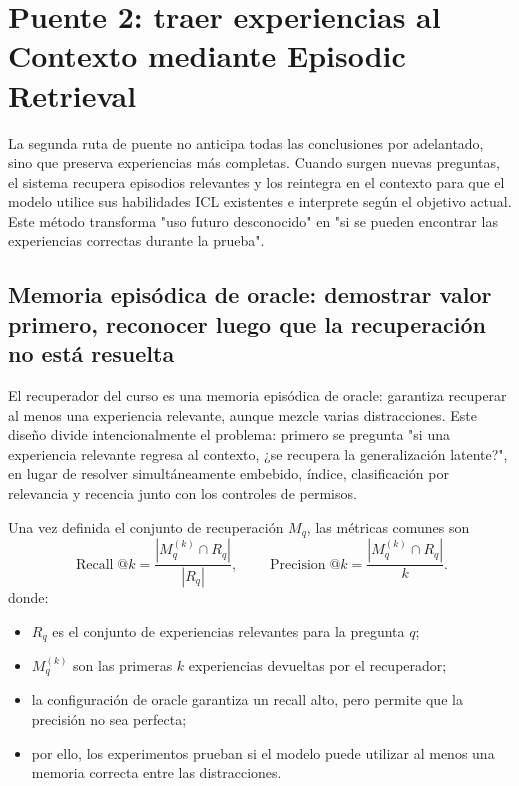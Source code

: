 \section{Puente 2: traer experiencias al Contexto mediante Episodic Retrieval}

La segunda ruta de puente no anticipa todas las conclusiones por adelantado, sino que preserva experiencias más completas. Cuando surgen nuevas preguntas, el sistema recupera episodios relevantes y los reintegra en el contexto para que el modelo utilice sus habilidades ICL existentes e interprete según el objetivo actual. Este método transforma "uso futuro desconocido" en "si se pueden encontrar las experiencias correctas durante la prueba".

\subsection{Memoria episódica de oracle: demostrar valor primero, reconocer luego que la recuperación no está resuelta}

El recuperador del curso es una memoria episódica de oracle: garantiza recuperar al menos una experiencia relevante, aunque mezcle varias distracciones. Este diseño divide intencionalmente el problema: primero se pregunta "si una experiencia relevante regresa al contexto, ¿se recupera la generalización latente?", en lugar de resolver simultáneamente embebido, índice, clasificación por relevancia y recencia junto con los controles de permisos.


Una vez definida el conjunto de recuperación $M_q$, las métricas comunes son
$$
\operatorname{Recall}@k=\frac{|M_q^{(k)}\cap R_q|}{|R_q|},
\qquad
\operatorname{Precision}@k=\frac{|M_q^{(k)}\cap R_q|}{k}.
$$
donde:
\begin{itemize}
  \item $R_q$ es el conjunto de experiencias relevantes para la pregunta $q$;
  \item $M_q^{(k)}$ son las primeras $k$ experiencias devueltas por el recuperador;
  \item la configuración de oracle garantiza un recall alto, pero permite que la precisión no sea perfecta;
  \item por ello, los experimentos prueban si el modelo puede utilizar al menos una memoria correcta entre las distracciones.
\end{itemize}

